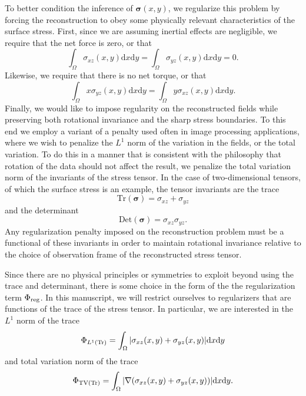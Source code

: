 \documentclass[aps,prl,reprint,twocolumn,groupedaddress,showpacs]{revtex4}
\newcommand{\bsigma}{{\boldsymbol\sigma}}
\def\dd{\mbox{d}}
\begin{document}
To better condition the inference of $\bsigma(x,y)$, we regularize
this problem by forcing the reconstruction to obey some physically
relevant characteristics of the surface stress. First, since we are
assuming inertial effects are negligible, we require that the net
force is zero, or that
\begin{equation}
\int_\Omega\sigma_{xz}(x,y)\dd x \dd y= \int_\Omega\sigma_{yz}(x,y)\dd x \dd y = 0.
\label{NOFORCE}
\end{equation}
Likewise, we require that there is no net torque, or that
\begin{equation}
\int_\Omega x \sigma_{yz}(x,y) \dd x \dd y  = \int_\Omega y\sigma_{xz}(x,y) \dd x \dd y.
\label{NOTORQUE}
\end{equation}
%
Finally, we would like to impose regularity on the reconstructed
fields while preserving both rotational invariance and the sharp
stress boundaries. To this end we employ a variant of a penalty used often in
image processing applications, where we wish to penalize the $L^1$
norm of the variation in the fields, or the total variation. To do
this in a manner that is consistent with the philosophy that
rotation of the data should not affect the result, we penalize the
total variation norm of the invariants of the stress tensor. In the
case of two-dimensional tensors, of which the surface stress is an
example, the tensor invariants are the trace
\begin{equation}
\textrm{Tr}(\bsigma) = \sigma_{xz} + \sigma_{yz}
\end{equation}
and the determinant
\begin{equation}
\textrm{Det}(\bsigma) = \sigma_{xz} \sigma_{yz}.
\end{equation}
Any regularization penalty imposed on the reconstruction problem must
be a functional of these invariants in order to maintain rotational
invariance relative to the choice of observation frame of the
reconstructed stress tensor.
 
Since there are no physical principles or symmetries to exploit beyond
using the trace and determinant, there is some choice in the form of
the the regularization term $\Phi_{\rm reg}$.  In this manuscript, we
will restrict ourselves to regularizers that are 
functions of the trace of the stress tensor. In
particular, we are interested in the $L^1$ norm of the trace
\begin{equation}
\Phi_{L^1({\rm Tr})} = \int_\Omega \vert \sigma_{xz}(x,y) + \sigma_{yz}(x,y)  \vert \dd x\dd y
\label{eq:PhiL1Tr}
\end{equation}
and total variation norm of the trace
%
\begin{equation}
\Phi_{\rm TV(Tr)} =  \int_\Omega | \nabla(\sigma_{xz}(x,y) + \sigma_{yz}(x,y) ) | \dd x\dd y.
\label{eq:PhiTVTr}
\end{equation}
\end{document}
